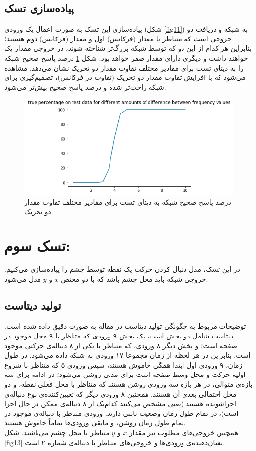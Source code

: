 \documentclass[a4paper]{article}
\begin{document}
\subsection{پیاده‌سازی تسک}
پیاده‌سازی این تسک به صورت اعمال یک ورودی (شکل \ref{fig11}) به شبکه و دریافت دو خروجی است که متناظر با مقدار (فرکانس) اول و مقدار (فرکانس) دوم هستند؛ بنابراین هر کدام از این دو که توسط شبکه بزرگ‌تر شناخته شوند، در خروجی مقدار یک خواهند داشت و دیگری دارای مقدار صفر خواهد بود. شکل \ref{fig12} درصد پاسخ صحیح شبکه را به دیتای تست برای مقادیر مختلف تفاوت مقدار دو تحریک نشان می‌دهد. مشاهده می‌شود که با افزایش تفاوت مقدار دو تحریک (تفاوت در فرکانس)، تصمیم‌گیری برای شبکه راحت‌تر شده و درصد پاسخ صحیح بیش‌تر می‌شود.
\begin{figure}[h!]
	\centering
	\includegraphics[scale=0.7]{fig12.png}
	\caption{درصد پاسخ صحیح شبکه به دیتای تست برای مقادیر مختلف تفاوت مقدار دو تحریک}
	\label{fig12}
\end{figure}

\section{تسک سوم: }
در این تسک، مدل دنبال کردن حرکت یک نقطه توسط چشم را پیاده‌سازی می‌کنیم. خروجی شبکه باید محل چشم باشد که با دو مختص $x$ و $y$ مدل می‌شود.

\subsection{تولید دیتاست}
توضیحات مربوط به چگونگی تولید دیتاست در مقاله به صورت دقیق داده شده است. دیتاست شامل دو بخش است، یک بخش ۹ ورودی که متناظر با ۹ محل موجود در صفحه است؛ و بخش دیگر ۸ ورودی، که متناظر با یکی از ۸ دنباله‌ی حرکتی موجود است. بنابراین در هر لحظه از زمان مجموعا ۱۷ ورودی به شبکه داده می‌شود. در طول زمان، ۹ ورودی اول ابتدا همگی خاموش هستند، سپس ورودی ۵ که متناظر با شروع اولیه حرکت و محل وسط صفحه است برای مدتی روشن می‌شود؛ در ادامه برای سه بازه‌ی متوالی، در هر بازه سه ورودی روشن هستند که متناظر با محل فعلی نقطه،‌ و دو محل احتمالی بعدی آن هستند. همچنین ۸ ورودی دیگر که تعیین‌کننده‌ی نوع دنباله‌ی اجراشونده هستند (یعنی مشخص می‌کنند کدام‌یک از ۸ دنباله‌ی ممکن در حال اجرا است)، در تمام طول زمان وضعیت ثابتی دارند. ورودی متناظر با دنباله‌ی موجود در تمام طول زمان روشن، و مابقی ورودی‌ها تماماً خاموش هستند.\\
همچنین خروجی‌های مطلوب نیز مقدار $x$ و $y$ متناظر با محل چشم می‌باشند. شکل \ref{fig13} نشان‌دهنده‌ی ورودی‌ها و خروجی‌های متناظر با دنباله‌ی شماره ۲ است.
\end{document}
